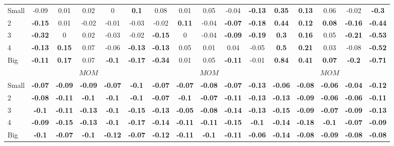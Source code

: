 \begin{table}[H]
\begin{tabular}{lccccc|ccccc|ccccc}
Small & -0.09 & 0.01 & 0.02 & 0 & \textbf{0.1} & 0.08 & 0.01 & 0.05 & -0.04 & \textbf{-0.13} & \textbf{0.35} & \textbf{0.13} & 0.06 & -0.02 & \textbf{-0.3} \\
2 & \textbf{-0.15} & 0.01 & -0.02 & -0.01 & -0.03 & -0.02 & \textbf{0.11} & -0.04 & \textbf{-0.07} & \textbf{-0.18} & \textbf{0.44} & \textbf{0.12} & \textbf{0.08} & \textbf{-0.16} & \textbf{-0.44} \\
3 & \textbf{-0.32} & 0 & 0.02 & -0.03 & -0.02 & \textbf{-0.15} & 0 & -0.04 & \textbf{-0.09} & \textbf{-0.19} & \textbf{0.3} & \textbf{0.16} & 0.05 & \textbf{-0.21} & \textbf{-0.53} \\
4 & \textbf{-0.13} & \textbf{0.15} & 0.07 & -0.06 & \textbf{-0.13} & \textbf{-0.13} & 0.05 & 0.01 & 0.04 & -0.05 & \textbf{0.5} & \textbf{0.21} & 0.03 & -0.08 & \textbf{-0.52} \\
Big & \textbf{-0.11} & \textbf{0.17} & 0.07 & \textbf{-0.1} & \textbf{-0.17} & \textbf{-0.34} & 0.01 & 0.05 & \textbf{-0.11} & -0.01 & \textbf{0.84} & \textbf{0.41} & \textbf{0.07} & \textbf{-0.2} & \textbf{-0.71} \\
 & \multicolumn{5}{c|}{$MOM$} & \multicolumn{5}{c|}{$MOM$} & \multicolumn{5}{c}{$MOM$} \\
Small & \textbf{-0.07} & \textbf{-0.09} & \textbf{-0.09} & \textbf{-0.07} & \textbf{-0.1} & \textbf{-0.07} & \textbf{-0.07} & \textbf{-0.08} & \textbf{-0.07} & \textbf{-0.13} & \textbf{-0.06} & \textbf{-0.08} & \textbf{-0.06} & \textbf{-0.04} & \textbf{-0.12} \\
2 & \textbf{-0.08} & \textbf{-0.11} & \textbf{-0.1} & \textbf{-0.1} & \textbf{-0.1} & \textbf{-0.07} & \textbf{-0.1} & \textbf{-0.07} & \textbf{-0.11} & \textbf{-0.13} & \textbf{-0.13} & \textbf{-0.09} & \textbf{-0.06} & \textbf{-0.06} & \textbf{-0.11} \\
3 & \textbf{-0.1} & \textbf{-0.11} & \textbf{-0.13} & \textbf{-0.1} & \textbf{-0.15} & \textbf{-0.13} & \textbf{-0.05} & \textbf{-0.08} & \textbf{-0.14} & \textbf{-0.13} & \textbf{-0.15} & \textbf{-0.09} & \textbf{-0.07} & \textbf{-0.09} & \textbf{-0.13} \\
4 & \textbf{-0.09} & \textbf{-0.15} & \textbf{-0.13} & \textbf{-0.1} & \textbf{-0.17} & \textbf{-0.14} & \textbf{-0.11} & \textbf{-0.11} & \textbf{-0.15} & \textbf{-0.1} & \textbf{-0.14} & \textbf{-0.18} & \textbf{-0.1} & \textbf{-0.07} & \textbf{-0.09} \\
Big & \textbf{-0.1} & \textbf{-0.07} & \textbf{-0.1} & \textbf{-0.12} & \textbf{-0.07} & \textbf{-0.12} & \textbf{-0.11} & \textbf{-0.1} & \textbf{-0.11} & \textbf{-0.06} & \textbf{-0.14} & \textbf{-0.08} & \textbf{-0.09} & \textbf{-0.08} & \textbf{-0.08} \\

\end{tabular}
\end{table}
